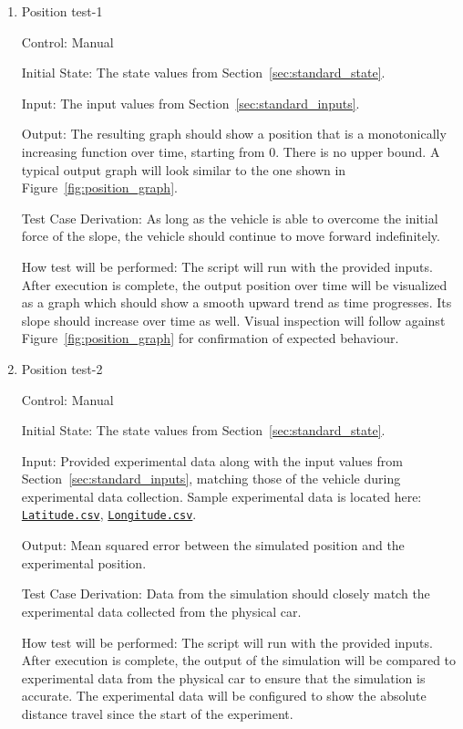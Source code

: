 \documentclass[12pt, titlepage]{article}
\newcommand{\refdata}[2]{
  \href{https://github.com/gr812b/CVT-Simulator/blob/main/experimental-data/#1
  }{\texttt{#2}}}
\begin{document}
\begin{enumerate}
  
  \item{Position test-1\\}
  
  Control: Manual
            
  Initial State: The state values from Section~\ref{sec:standard_state}.
  
  Input: The input values from Section~\ref{sec:standard_inputs}.
            
  Output: The resulting graph should show a position that is a monotonically increasing function over time, starting from 0. There is no upper bound. A typical output graph will look similar to the one shown in Figure~\ref{fig:position_graph}.
  
  Test Case Derivation: As long as the vehicle is able to overcome the initial force of the slope, the vehicle should continue to move forward indefinitely.
  
  How test will be performed: The script will run with the provided inputs. After execution is complete, the output position over time will be visualized as a graph which should show a smooth upward trend as time progresses. Its slope should increase over time as well. Visual inspection will follow against Figure~\ref{fig:position_graph} for confirmation of expected behaviour.
  
  \item{Position test-2\\}

  Control: Manual

  Initial State: The state values from Section~\ref{sec:standard_state}.
  
  Input: Provided experimental data along with the input values from Section~\ref{sec:standard_inputs}, matching those of the vehicle during experimental data collection. Sample experimental data is located here: \refdata{GPS\%20LATITUDE.csv}{Latitude.csv}, \refdata{GPS\%20LONGITUDE.csv}{Longitude.csv}.

  Output: Mean squared error between the simulated position and the experimental position.

  Test Case Derivation: Data from the simulation should closely match the experimental data collected from the physical car.

  How test will be performed: The script will run with the provided inputs. After execution is complete, the output of the simulation will be compared to experimental data from the physical car to ensure that the simulation is accurate. The experimental data will be configured to show the absolute distance travel since the start of the experiment.

\end{enumerate}
		
\end{document}
